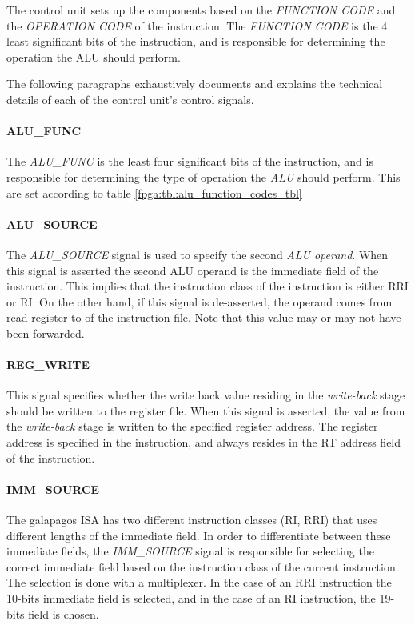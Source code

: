 The control unit sets up the components based on the \emph{FUNCTION CODE} and the \emph{OPERATION CODE} of the instruction.
The \emph{FUNCTION CODE} is the 4 least significant bits of the instruction, and is responsible for determining the operation the ALU should perform. 


 





The following paragraphs exhaustively documents and explains the technical details of each of the control unit's control signals.

\paragraph{ALU\_FUNC}
The \emph{ALU\_FUNC} is the least four significant bits of the instruction, and is responsible for determining the type of operation the \emph{ALU} should perform.
This are set according to table \ref{fpga:tbl:alu_function_codes_tbl} 



\paragraph{ALU\_SOURCE}
The \emph{ALU\_SOURCE} signal is used to specify the second \emph{ALU operand}.
When this signal is asserted the second ALU operand is the immediate field of the instruction.
This implies that the instruction class of the instruction is either RRI or RI.
On the other hand, if this signal is de-asserted, the operand comes from read register to of the instruction file. Note that this value may or may not have been forwarded. 

\paragraph{REG\_WRITE}
This signal specifies whether the write back value residing in the \emph{write-back} stage should be written to the register file.
When this signal is asserted, the value from the \emph{write-back} stage is written to the specified register address.
The register address is specified in the instruction, and always resides in the RT address field of the instruction.

\paragraph{IMM\_SOURCE}
The \Gls{galapagos} ISA has two different instruction classes (RI, RRI) that uses different lengths of the immediate field.
In order to differentiate between these immediate fields, the \emph{IMM\_SOURCE} signal is responsible for selecting the correct immediate field based on the instruction class of the current instruction.
The selection is done with a multiplexer.
In the case of an RRI instruction the 10-bits immediate field is selected, and in the case of an RI instruction, the 19-bits field is chosen.

